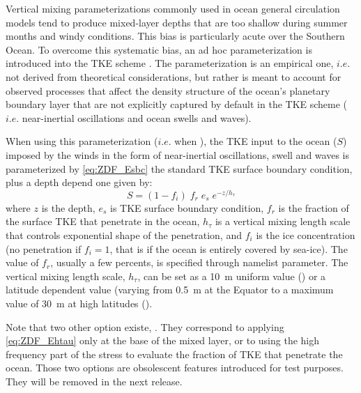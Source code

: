 \documentclass[../tex_main/NEMO_manual]{subfiles}
\begin{document}
Vertical mixing parameterizations commonly used in ocean general circulation models tend to
produce mixed-layer depths that are too shallow during summer months and windy conditions.
This bias is particularly acute over the Southern Ocean.
To overcome this systematic bias, an ad hoc parameterization is introduced into the TKE scheme \cite{Rodgers_2014}. 
The parameterization is an empirical one, $i.e.$ not derived from theoretical considerations,
but rather is meant to account for observed processes that affect the density structure of 
the ocean’s planetary boundary layer that are not explicitly captured by default in the TKE scheme 
($i.e.$ near-inertial oscillations and ocean swells and waves).

When using this parameterization ($i.e.$ when ),
the TKE input to the ocean ($S$) imposed by the winds in the form of near-inertial oscillations,
swell and waves is parameterized by \autoref{eq:ZDF_Esbc} the standard TKE surface boundary condition,
plus a depth depend one given by:
\begin{equation}  \label{eq:ZDF_Ehtau}
S = (1-f_i) \; f_r \; e_s \; e^{-z / h_\tau} 
\end{equation}
where $z$ is the depth, $e_s$ is TKE surface boundary condition, $f_r$ is the fraction of the surface TKE that
penetrate in the ocean, $h_\tau$ is a vertical mixing length scale that controls exponential shape of
the penetration, and $f_i$ is the ice concentration
(no penetration if $f_i=1$, that is if the ocean is entirely covered by sea-ice).
The value of $f_r$, usually a few percents, is specified through  namelist parameter.
The vertical mixing length scale, $h_\tau$, can be set as a 10~m uniform value () or
a latitude dependent value (varying from 0.5~m at the Equator to a maximum value of 30~m at high latitudes
(). 

Note that two other option existe, .
They correspond to applying \autoref{eq:ZDF_Ehtau} only at the base of the mixed layer,
or to using the high frequency part of the stress to evaluate the fraction of TKE that penetrate the ocean. 
Those two options are obsolescent features introduced for test purposes.
They will be removed in the next release. 



\end{document}
